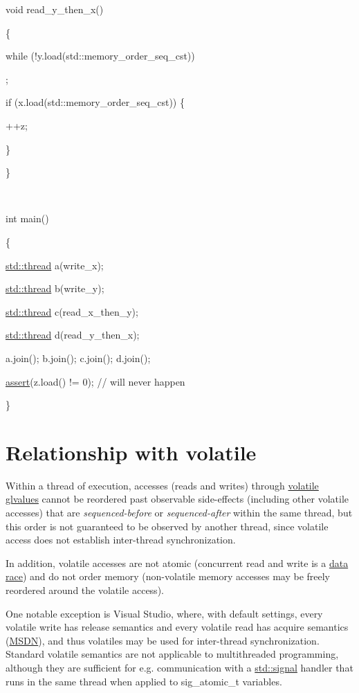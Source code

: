 \documentclass[
]{article}
\begin{document}
void read\_y\_then\_x()

\{

while (!y.load(std::memory\_order\_seq\_cst))

;

if (x.load(std::memory\_order\_seq\_cst)) \{

++z;

\}

\}

~

int main()

\{

\href{http://en.cppreference.com/w/cpp/thread/thread}{std::thread}
a(write\_x);

\href{http://en.cppreference.com/w/cpp/thread/thread}{std::thread}
b(write\_y);

\href{http://en.cppreference.com/w/cpp/thread/thread}{std::thread}
c(read\_x\_then\_y);

\href{http://en.cppreference.com/w/cpp/thread/thread}{std::thread}
d(read\_y\_then\_x);

a.join(); b.join(); c.join(); d.join();

\href{http://en.cppreference.com/w/cpp/error/assert}{assert}(z.load() !=
0); // will never happen

\}

\hypertarget{relationship-with-volatile}{%
\section{Relationship with volatile}\label{relationship-with-volatile}}

Within a thread of execution, accesses (reads and writes) through
\href{https://en.cppreference.com/w/cpp/language/cv}{volatile glvalues}
cannot be reordered past observable side-effects (including other
volatile accesses) that are \emph{sequenced-before} or
\emph{sequenced-after} within the same thread, but this order is not
guaranteed to be observed by another thread, since volatile access does
not establish inter-thread synchronization.

In addition, volatile accesses are not atomic (concurrent read and write
is a \href{https://en.cppreference.com/w/cpp/language/memory_model}{data
race}) and do not order memory (non-volatile memory accesses may be
freely reordered around the volatile access).

One notable exception is Visual Studio, where, with default settings,
every volatile write has release semantics and every volatile read has
acquire semantics
(\href{http://msdn.microsoft.com/en-us/library/12a04hfd(v=vs.100).aspx}{MSDN}),
and thus volatiles may be used for inter-thread synchronization.
Standard volatile semantics are not applicable to multithreaded
programming, although they are sufficient for e.g. communication with a
\href{https://en.cppreference.com/w/cpp/utility/program/signal}{std::signal}
handler that runs in the same thread when applied to sig\_atomic\_t
variables.
\end{document}
